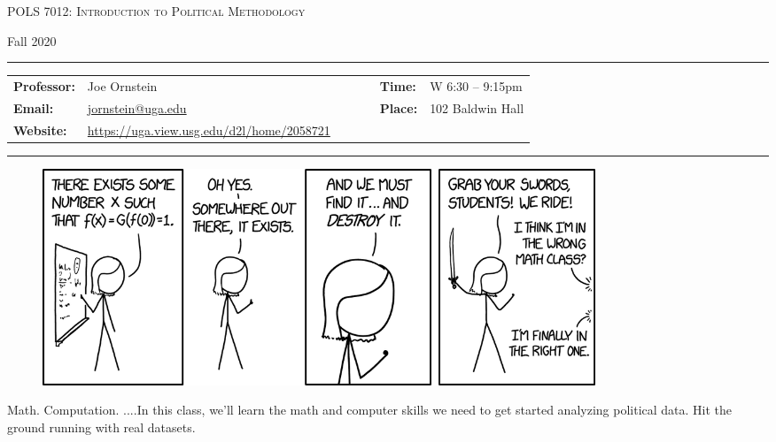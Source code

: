 \documentclass[11pt, letterpaper]{article}
\begin{document}
\begin{center}
{\Large \textsc{POLS 7012: Introduction to Political Methodology}}
\end{center}
\begin{center}
{\large Fall 2020}
\end{center}

\begin{center}
\rule{6.5in}{0.4pt}
\begin{minipage}[t]{.96\textwidth}
\begin{tabular}{llcccll}
\textbf{Professor:} & Joe Ornstein & & &  & \textbf{Time:} & W 6:30 -- 9:15pm \\
\textbf{Email:} &  \href{mailto:jornstein@uga.edu}{jornstein@uga.edu} & & & & \textbf{Place:} & 102 Baldwin Hall\\
\textbf{Website:} & \href{https://uga.view.usg.edu/d2l/home/2058721}{https://uga.view.usg.edu/d2l/home/2058721} & & & & &
\end{tabular}
\end{minipage}
\rule{6.5in}{0.4pt}
\end{center}
\vspace{.15cm}
\setlength{\unitlength}{1in}
\renewcommand{\arraystretch}{2}

\begin{figure}[h]
	\centering
	\href{https://xkcd.com/1856/}{\includegraphics[width=0.8\textwidth]{img/existence_proof_2x.png}}
\end{figure}


\noindent Math. Computation. ....In this class, we'll learn the math and computer skills we need to get started analyzing political data. Hit the ground running with real datasets.
\end{document}
